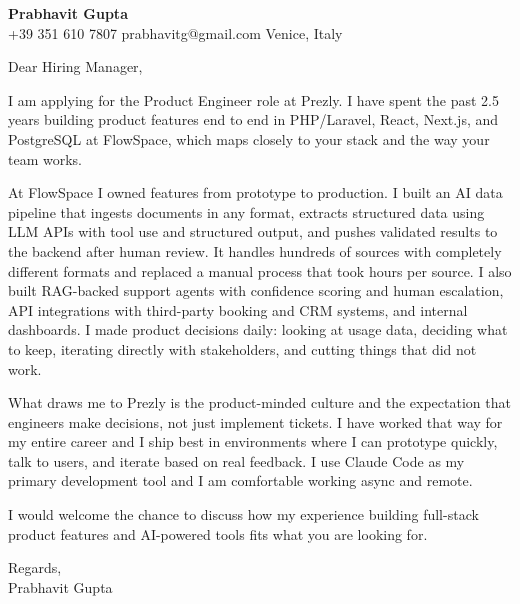 \documentclass[a4paper,11pt]{letter}
\begin{document}
{\large\bfseries Prabhavit Gupta}\\[2pt]
{\small +39 351 610 7807 \quad prabhavitg@gmail.com \quad Venice, Italy}

\vspace{16pt}

Dear Hiring Manager,

I am applying for the Product Engineer role at Prezly. I have spent the past 2.5 years building product features end to end in PHP/Laravel, React, Next.js, and PostgreSQL at FlowSpace, which maps closely to your stack and the way your team works.

At FlowSpace I owned features from prototype to production. I built an AI data pipeline that ingests documents in any format, extracts structured data using LLM APIs with tool use and structured output, and pushes validated results to the backend after human review. It handles hundreds of sources with completely different formats and replaced a manual process that took hours per source. I also built RAG-backed support agents with confidence scoring and human escalation, API integrations with third-party booking and CRM systems, and internal dashboards. I made product decisions daily: looking at usage data, deciding what to keep, iterating directly with stakeholders, and cutting things that did not work.

What draws me to Prezly is the product-minded culture and the expectation that engineers make decisions, not just implement tickets. I have worked that way for my entire career and I ship best in environments where I can prototype quickly, talk to users, and iterate based on real feedback. I use Claude Code as my primary development tool and I am comfortable working async and remote.

I would welcome the chance to discuss how my experience building full-stack product features and AI-powered tools fits what you are looking for.

Regards,\\
Prabhavit Gupta
\end{document}

